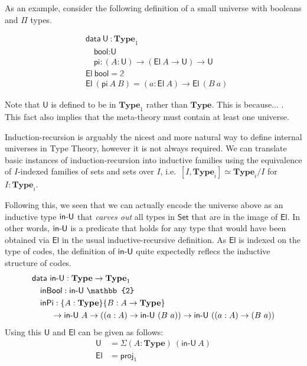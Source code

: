 \documentclass{easychair}
\newcommand{\ad}[1]{\AgdaFunction{#1}}
\newcommand{\Set}{\textsf{Set}}
\newcommand{\mType}{\mathbf{Type}}
\newcommand{\U}{\textsf{U}}
\newcommand{\El}{\textsf{El}}
\providecommand\mathbbm{\mathbb}
\begin{document}
As an example, consider the following definition of a small universe with
booleans and $\Pi$ types.

\begin{align*}
  & \textsf{data}\ \U\ : \mType_1 \\
  & \quad \textsf{bool} : \U \\
  & \quad \textsf{pi} : (A : \U) \to (\El\ A \to \U) \to \U \\
  & \El\ \textsf{bool} = \mathbbm{2} \\
  & \El\ (\textsf{pi}\ A\ B) = (a : \El\ A) \to \El\ (B\ a)
\end{align*}

Note that $\U$ is defined to be in $\mType_1$ rather than $\mType$. This is
because... . This fact also implies that the
meta-theory must contain at least one universe.

Induction-recursion is arguably the nicest and more natural way to define
internal universes in Type Theory, however it is not always required.
%
We can translate basic instances of induction-recursion into inductive families
using the equivalence of $I$-indexed families of sets and sets over $I$,
i.e.\ $[I, \mType_i] \simeq \mType_i/I$ for $I : \mType_i$.

Following this, we seen that we can actually encode the universe above as an
inductive type $\ad{in-U}$ that \emph{carves out} all types in $\Set$ that are
in the image of $\El$. In other words, $\ad{in-U}$ is a predicate that holds for
any type that would have been obtained via $\El$ in the usual
inductive-recursive definition. As $\El$ is indexed on the type of codes, the
definition of $\ad{in-U}$ quite expectedly reflecs the inductive structure of
codes.
%
\begin{align*}
  & \textsf{data}\ \ad{in-U} : \mType \to \mType_1 \\
  & \quad \textsf{inBool} : \textsf{in-U}\ \mathbbm{2} \\
  & \quad \textsf{inPi}
  :  \{A : \mType\} \{B : A \to \mType\}\\
  & \ \qquad \to \ad{in-U}\ A
  \to ((a : A) \to \ad{in-U}\ (B\ a))
  \to \ad{in-U}\ ((a : A) \to (B\ a))
\end{align*}
Using this $\U$ and $\El$ can be given as follows:
\begin{align*}
  \U & = \Sigma (A : \mType)\ (\textsf{in-U}\ A) \\
  \El & = \textsf{proj}_1
\end{align*}
\end{document}
